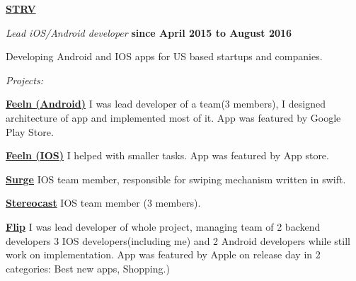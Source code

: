 \documentclass[10pt]{article}
\newenvironment{outerlist}[0]%
        {\begin{itemize}}
        {\end{itemize}
         \vspace{-.6\baselineskip}}
\newenvironment{innerlist}[0]%
        {\begin{compactitem}}
        {\end{compactitem}}
\newcommand{\blankline}{\quad\pagebreak[2]}
\begin{document}
\blankline

\href{http://www.strv.com/}{\textbf{STRV}}
\begin{outerlist}
  \item[] \textit{Lead iOS/Android developer}%
          \hfill \textbf{since April 2015 to August 2016}
  \begin{innerlist}
    \item[] Developing Android and IOS apps for US based startups
and companies.
  \end{innerlist}
    \item[] \textit{Projects:}%
    	 \begin{innerlist}
	 	 \item[]  \href{https://play.google.com/store/apps/details?id=com.feeln.android}{\textbf{Feeln (Android)}} \newline
		 I was lead developer of a team(3 members), I designed architecture of app
and implemented most of it. App was featured by Google Play Store.
		\newline
	 	 \item[]  \href{https://itunes.apple.com/us/app/feeln/id472567577?mt=8}{\textbf{Feeln (IOS)}} \newline
		 I helped with smaller tasks. App was featured by App store.
		 \newline
	 	 \item[]  \href{https://itunes.apple.com/us/app/surge-gay-dating-app-for-gay/id709551897?mt=8}{\textbf{Surge}} \newline
		 IOS team member, responsible for swiping mechanism written in
swift.
		\newline
	 	 \item[]  \href{https://itunes.apple.com/us/app/stereocast-exclusive-music/id1027457656?mt=8}{\textbf{Stereocast}} \newline
		 IOS team member (3 members).
		 \newline
	 	 \item[]  \href{https://itunes.apple.com/us/app/flip-everyones-sneaker-connect/id961287853?mt=8}{\textbf{Flip}} \newline
		  I was lead developer of whole project, managing
team of 2 backend developers 3 IOS developers(including me) and 2
Android developers while still work on implementation. App was featured
by Apple on release day in 2 categories: Best new apps, Shopping.)
	 \end{innerlist}
\end{outerlist}
\end{document}
